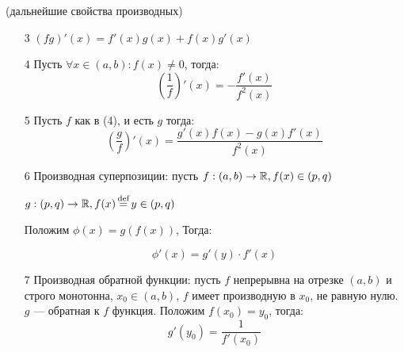



\begin{properties} (дальнейшие свойства производных)
    \begin{enumerate}
        \item[3] $(fg)'(x) = f'(x)g(x) + f(x)g'(x)$
        \item[4] Пусть $\forall x \in (a,b): f(x) \neq 0$, тогда: $$\left(\frac{1}{f}\right)'(x) = -\frac{f'(x)}{f^2(x)}$$
        \item[5] Пусть $f$ как в (4), и есть $g$ тогда: $$\left(\frac{g}{f}\right)'(x) = \frac{g'(x)f(x) - g(x)f'(x)}{f^2(x)}$$
        \item[6] Производная суперпозиции: пусть $f: (a, b) \to \mathbb{R}, f(x) \in (p, q)$
        
        $g: (p, q) \to \mathbb{R}, f(x) \operatorname*{\overset{\text{def}}{=}} y \in (p, q)$

        Положим $\phi(x) = g(f(x))$, Тогда:

        $$\phi'(x) = g'(y) \cdot f'(x)$$

        \item[7] Производная обратной функции: пусть $f$ непрерывна на отрезке $(a, b)$ и строго монотонна, $x_0 \in (a, b)$, $f$ имеет производную в $x_0$, не равную нулю. $g$ --- обратная к $f$ функция. Положим $f(x_0) = y_0$, тогда:
        $$g'(y_0) = \frac{1}{f'(x_0)}$$
    \end{enumerate}
\end{properties}

